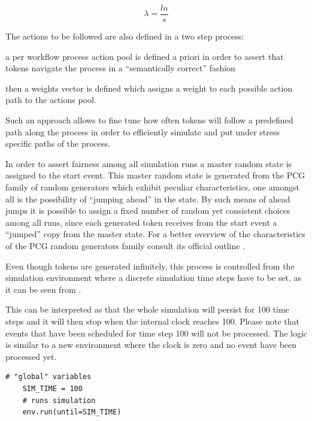 \documentclass{seal_thesis}
\begin{document}
\begin{equation}
\label{eq:generation_interval}
	\lambda = \frac{l n}{s}
\end{equation}

The actions to be followed are also defined in a two step process:
\begin{enumerate*}
	\item a per workflow process action pool is defined a priori in order to assert that tokens navigate the process in a ``semantically correct'' fashion
	\item then a weights vector is defined which assigns a weight to each possible action path to the actions pool.
\end{enumerate*}

Such an approach allows to fine tune how often tokens will follow a predefined path along the process in order to efficiently simulate and put under stress specific paths of the process.

In order to assert fairness among all simulation runs a master random state is assigned to the start event. This master random state is generated from the PCG family of random generators which exhibit peculiar characteristics, one amongst all is the possibility of ``jumping ahead'' in the state. By such means of ahead jumps it is possible to assign a fixed number of random yet consistent choices among all runs, since each generated token receives from the start event a ``jumped'' copy from the master state. For a better overview of the characteristics of the PCG random generators family consult its official outline .

Even though tokens are generated infinitely, this process is controlled from the simulation environment where a discrete simulation time steps have to be set, as it can be seen from .

This can be interpreted as that the whole simulation will persist for 100 time steps and it will then stop when the internal clock reaches 100. Please note that events that have been scheduled for time step 100 will not be processed. The logic is similar to a new environment where the clock is zero and no event have been processed yet.

\begin{lstlisting}[caption=Starting the simulation with discrete time steps,label=lst:simulation_steps,style=CustomPython]
    # "global" variables
    SIM_TIME = 100
    # runs simulation
    env.run(until=SIM_TIME)
\end{lstlisting}
\end{document}
